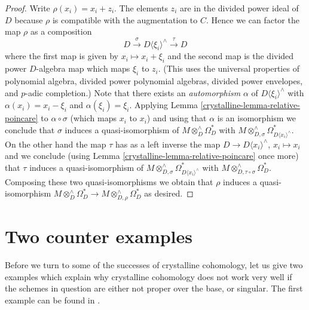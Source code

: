 \begin{proof}
\medskip\noindent
Write $\rho(x_i) = x_i + z_i$. The elements $z_i$ are in the
divided power ideal of $D$ because $\rho$ is compatible with the
augmentation to $C$. Hence we can factor the map $\rho$
as a composition
$$
D \xrightarrow{\sigma} D\langle \xi_i \rangle^\wedge \xrightarrow{\tau} D
$$
where the first map is given by $x_i \mapsto x_i + \xi_i$ and the
second map is the divided power $D$-algebra map which maps $\xi_i$ to $z_i$.
(This uses the universal properties of polynomial algebra, divided
power polynomial algebras, divided power envelopes, and $p$-adic completion.)
Note that there exists an {\it automorphism} $\alpha$ of
$D\langle \xi_i \rangle^\wedge$ with $\alpha(x_i) = x_i - \xi_i$
and $\alpha(\xi_i) = \xi_i$. Applying Lemma \ref{crystalline-lemma-relative-poincare}
to $\alpha \circ \sigma$ (which maps $x_i$ to $x_i$) and using that
$\alpha$ is an isomorphism we conclude that $\sigma$ induces a
quasi-isomorphism of $M \otimes^\wedge_D \Omega^*_D$ with
$M \otimes^\wedge_{D, \sigma} \Omega^*_{D\langle x_i \rangle^\wedge}$.
On the other hand the map $\tau$ has as a left inverse the
map $D \to D\langle x_i \rangle^\wedge$, $x_i \mapsto x_i$
and we conclude (using Lemma \ref{crystalline-lemma-relative-poincare} once more)
that $\tau$ induces a quasi-isomorphism of
$M \otimes^\wedge_{D, \sigma} \Omega^*_{D\langle x_i \rangle^\wedge}$
with $M \otimes^\wedge_{D, \tau \circ \sigma} \Omega^*_D$. Composing these
two quasi-isomorphisms we obtain that $\rho$ induces a quasi-isomorphism
$M \otimes^\wedge_D \Omega^*_D \to M \otimes^\wedge_{D, \rho} \Omega^*_D$
as desired.
\end{proof}

\section{Two counter examples}
\label{crystalline-section-examples}
Before we turn to some of the successes of crystalline cohomology,
let us give two examples which explain why crystalline cohomology
does not work very well if the schemes in question are either not
proper over the base, or singular. The first example can be found
in \cite{BO}.

